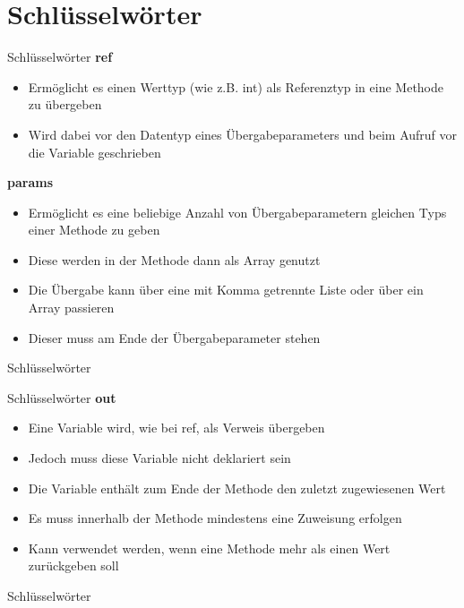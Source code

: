 \section{Schlüsselwörter}
\begin{frame}{Schlüsselwörter}
	\textbf{ref}\\
	\begin{itemize}
		\item Ermöglicht es einen Werttyp (wie z.B. int) als Referenztyp in eine Methode zu übergeben
		\item Wird dabei vor den Datentyp eines Übergabeparameters und beim Aufruf vor die Variable geschrieben
	\end{itemize}
	\textbf{params}\\
	\begin{itemize}
		\item Ermöglicht es eine beliebige Anzahl von Übergabeparametern gleichen Typs einer Methode zu geben
		\item Diese werden in der Methode dann als Array genutzt
		\item Die Übergabe kann über eine mit Komma getrennte Liste oder über ein Array passieren
		\item Dieser muss am Ende der Übergabeparameter stehen
	\end{itemize}
\end{frame}

\begin{frame}{Schlüsselwörter}
	
	
\end{frame}

\begin{frame}{Schlüsselwörter}
	\textbf{out}\\
	\begin{itemize}
		\item Eine Variable wird, wie bei \alert{ref}, als Verweis übergeben
		\item Jedoch muss diese Variable nicht deklariert sein
		\item Die Variable enthält zum Ende der Methode den zuletzt zugewiesenen Wert
		\item Es muss innerhalb der Methode mindestens eine Zuweisung erfolgen
		\item Kann verwendet werden, wenn eine Methode mehr als einen Wert zurückgeben soll
	\end{itemize}
\end{frame}

\begin{frame}{Schlüsselwörter}
	
	
\end{frame}



